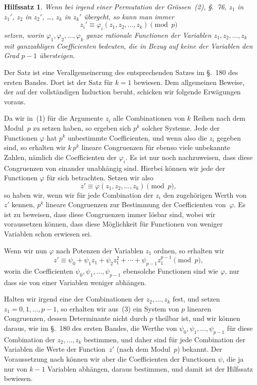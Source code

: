 \documentclass[12pt,a4paper]{article}
\newtheorem*{hilfssatz}{Hilfssatz}
\begin{document}
\begin{hilfssatz}
Wenn bei irgend einer Permutation der Gr\"ossen~(2), \S.~76, $z_1$ in $z_1'$, $z_2$ in $z_2'$, \ldots, $z_k$ in $z_k'$ \"ubergeht, so kann man immer
\begin{equation}
\tag{1}
z_i' \equiv \varphi_i(z_1,z_2,\ldots,z_k) \pmod p
\end{equation}
setzen, worin $\varphi_1,\varphi_2,\ldots,\varphi_k$ ganze rationale Functionen der Variablen $z_1,z_2,\ldots,z_k$ mit ganzzahligen Coefficienten bedeuten, die in Bezug auf keine der Variablen den Grad $p-1$ \"ubersteigen.
\end{hilfssatz}

Der Satz ist eine Verallgemeinerung des entsprechenden Satzes im \S.~180 des ersten Bandes. Dort ist der Satz f\"ur $k=1$ bewiesen. Dem allgemeinen Beweise, der auf der vollst\"andigen Induction beruht, schicken wir folgende Erw\"agungen voraus.

Da wir in~(1) f\"ur die Argumente $z_i$ alle Combinationen von $k$ Reihen nach dem Modul~$p$ zu setzen haben, so ergeben sich $p^k$ solcher Systeme. Jede der Functionen $\varphi$ hat $p^k$ unbestimmte Coefficienten, und wenn also die $z_i$ gegeben sind, so erhalten wir $k\,p^k$ lineare Congruenzen f\"ur ebenso viele unbekannte Zahlen, n\"amlich die Coefficienten der $\varphi_i$. Es ist nur noch nachzuweisen, dass diese Congruenzen von einander unabh\"angig sind. Hierbei k\"onnen wir jede der Functionen $\varphi$ f\"ur sich betrachten. Setzen wir also
\begin{equation}
\tag{2}
z' \equiv \varphi(z_1,z_2,\ldots,z_k) \pmod p,
\end{equation}
so haben wir, wenn wir f\"ur jede Combination der $z_i$ den zugeh\"origen Werth von $z'$ kennen, $p^k$ lineare Congruenzen zur Bestimmung der Coefficienten von~$\varphi$. Es ist zu beweisen, dass diese Congruenzen immer l\"osbar sind, wobei wir voraussetzen k\"onnen, dass diese M\"oglichkeit f\"ur Functionen von weniger Variablen schon erwiesen sei.

Wenn wir nun $\varphi$ nach Potenzen der Variablen $z_1$ ordnen, so erhalten wir
\begin{equation}
\tag{3}
z' \equiv \psi_0 + \psi_1 z_1 + \psi_2 z_1^2 + \cdots + \psi_{p-1} z_1^{p-1} \pmod p,
\end{equation}
worin die Coefficienten $\psi_0,\psi_1,\ldots,\psi_{p-1}$ ebensolche Functionen sind wie $\varphi$, nur dass sie von einer Variablen weniger abh\"angen.

Halten wir irgend eine der Combinationen der $z_2,\ldots,z_k$ fest, und setzen $z_1=0,1,\ldots,p-1$, so erhalten wir aus~(3) ein System von $p$ linearen Congruenzen, dessen Determinante nicht durch $p$ theilbar ist, und wir k\"onnen daraus, wie im \S.~180 des ersten Bandes, die Werthe von $\psi_0,\psi_1,\ldots,\psi_{p-1}$ f\"ur diese Combination der $z_2,\ldots,z_k$ bestimmen, und daher sind f\"ur jede Combination der Variablen die Werte der Function~$z'$ (nach dem Modul~$p$) bekannt. Der Voraussetzung nach k\"onnen wir aber die Coefficienten der Functionen $\psi$, die ja nur von $k-1$ Variablen abh\"angen, daraus bestimmen, und damit ist der Hilfssatz bewiesen.
\end{document}
